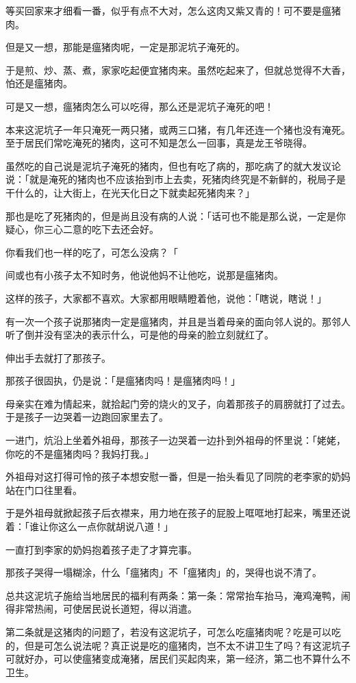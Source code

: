 \documentclass[UTF8]{ctexart}
\begin{document}
等买回家来才细看一番，似乎有点不大对，怎么这肉又紫又青的！可不要是瘟猪肉。

但是又一想，那能是瘟猪肉呢，一定是那泥坑子淹死的。

于是煎、炒、蒸、煮，家家吃起便宜猪肉来。虽然吃起来了，但就总觉得不大香，怕还是瘟猪肉。

可是又一想，瘟猪肉怎么可以吃得，那么还是泥坑子淹死的吧！

本来这泥坑子一年只淹死一两只猪，或两三口猪，有几年还连一个猪也没有淹死。至于居民们常吃淹死的猪肉，这可不知是怎么一回事，真是龙王爷晓得。

虽然吃的自己说是泥坑子淹死的猪肉，但也有吃了病的，那吃病了的就大发议论说：「就是淹死的猪肉也不应该抬到市上去卖，死猪肉终究是不新鲜的，税局子是干什么的，让大街上，在光天化日之下就卖起死猪肉来？」

那也是吃了死猪肉的，但是尚且没有病的人说：「话可也不能是那么说，一定是你疑心，你三心二意的吃下去还会好。

你看我们也一样的吃了，可怎么没病？「

间或也有小孩子太不知时务，他说他妈不让他吃，说那是瘟猪肉。

这样的孩子，大家都不喜欢。大家都用眼睛瞪着他，说他：「瞎说，瞎说！」

有一次一个孩子说那猪肉一定是瘟猪肉，并且是当着母亲的面向邻人说的。那邻人听了倒并没有坚决的表示什么，可是他的母亲的脸立刻就红了。

伸出手去就打了那孩子。

那孩子很固执，仍是说：「是瘟猪肉吗！是瘟猪肉吗！」

母亲实在难为情起来，就拾起门旁的烧火的叉子，向着那孩子的肩膀就打了过去。于是孩子一边哭着一边跑回家里去了。

一进门，炕沿上坐着外祖母，那孩子一边哭着一边扑到外祖母的怀里说：「姥姥，你吃的不是瘟猪肉吗？我妈打我。」

外祖母对这打得可怜的孩子本想安慰一番，但是一抬头看见了同院的老李家的奶妈站在门口往里看。

于是外祖母就掀起孩子后衣襟来，用力地在孩子的屁股上哐哐地打起来，嘴里还说着：「谁让你这么一点你就胡说八道！」

一直打到李家的奶妈抱着孩子走了才算完事。

那孩子哭得一塌糊涂，什么「瘟猪肉」不「瘟猪肉」的，哭得也说不清了。

总共这泥坑子施给当地居民的福利有两条：第一条：常常抬车抬马，淹鸡淹鸭，闹得非常热闹，可使居民说长道短，得以消遣。

第二条就是这猪肉的问题了，若没有这泥坑子，可怎么吃瘟猪肉呢？{吃是可以吃的，但是可怎么说法呢}？真正说是吃的瘟猪肉，岂不太不讲卫生了吗？有这泥坑子可就好办，可以使瘟猪变成淹猪，居民们买起肉来，第一经济，第二也不算什么不卫生。
\end{document}
